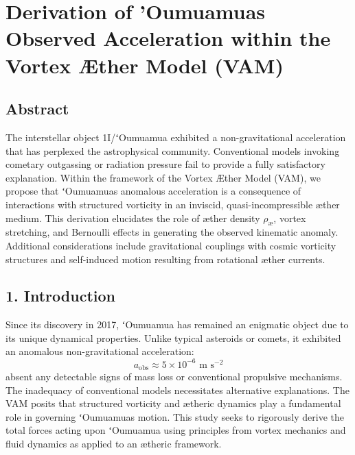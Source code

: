 

    \section{Derivation of 'Oumuamua\rqs s Observed Acceleration within the Vortex Æther Model (VAM)}

    \subsection*{Abstract}
    The interstellar object 1I/ʻOumuamua exhibited a non-gravitational acceleration that has perplexed the astrophysical community. Conventional models invoking cometary outgassing or radiation pressure fail to provide a fully satisfactory explanation. Within the framework of the Vortex Æther Model (VAM), we propose that ʻOumuamua\rqs s anomalous acceleration is a consequence of interactions with structured vorticity in an inviscid, quasi-incompressible æther medium. This derivation elucidates the role of æther density $\rho_\text{\ae}$, vortex stretching, and Bernoulli effects in generating the observed kinematic anomaly. Additional considerations include gravitational couplings with cosmic vorticity structures and self-induced motion resulting from rotational æther currents.

    \subsection*{1. Introduction}
    Since its discovery in 2017, ʻOumuamua has remained an enigmatic object due to its unique dynamical properties. Unlike typical asteroids or comets, it exhibited an anomalous non-gravitational acceleration:
    \begin{equation*}
        a_\text{obs} \approx 5 \times 10^{-6} \text{ m s}^{-2}
    \end{equation*}
    absent any detectable signs of mass loss or conventional propulsive mechanisms. The inadequacy of conventional models necessitates alternative explanations. The VAM posits that structured vorticity and ætheric dynamics play a fundamental role in governing ʻOumuamua\rqs s motion. This study seeks to rigorously derive the total forces acting upon ʻOumuamua using principles from vortex mechanics and fluid dynamics as applied to an ætheric framework.

